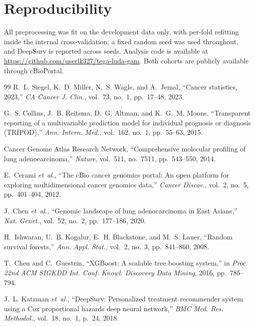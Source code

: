 \documentclass[journal]{IEEEtran}
\begin{document}
\section*{Reproducibility}
All preprocessing was fit on the development data only, with per-fold refitting
inside the internal cross-validation; a fixed random seed was used throughout,
and DeepSurv is reported across seeds. Analysis code is available at
\url{https://github.com/userlk327/tcga-luda-gam}. Both cohorts are publicly
available through cBioPortal.

\begin{thebibliography}{99}
 R.~L. Siegel, K.~D. Miller, N.~S. Wagle, and A.~Jemal,
``Cancer statistics, 2023,'' \emph{CA Cancer J. Clin.}, vol.~73, no.~1,
pp.~17--48, 2023.

 G.~S. Collins, J.~B. Reitsma, D.~G. Altman, and K.~G.~M.
Moons, ``Transparent reporting of a multivariable prediction model for
individual prognosis or diagnosis (TRIPOD),'' \emph{Ann. Intern. Med.},
vol.~162, no.~1, pp.~55--63, 2015.

 Cancer Genome Atlas Research Network, ``Comprehensive
molecular profiling of lung adenocarcinoma,'' \emph{Nature}, vol.~511,
no.~7511, pp.~543--550, 2014.

 E.~Cerami \emph{et~al.}, ``The cBio cancer genomics
portal: An open platform for exploring multidimensional cancer genomics data,''
\emph{Cancer Discov.}, vol.~2, no.~5, pp.~401--404, 2012.

 J.~Chen \emph{et~al.}, ``Genomic landscape of lung
adenocarcinoma in East Asians,'' \emph{Nat. Genet.}, vol.~52, no.~2,
pp.~177--186, 2020.

 H.~Ishwaran, U.~B. Kogalur, E.~H. Blackstone, and M.~S.
Lauer, ``Random survival forests,'' \emph{Ann. Appl. Stat.}, vol.~2, no.~3,
pp.~841--860, 2008.

 T.~Chen and C.~Guestrin, ``XGBoost: A scalable tree boosting
system,'' in \emph{Proc. 22nd ACM SIGKDD Int. Conf. Knowl. Discovery Data
Mining}, 2016, pp.~785--794.

 J.~L. Katzman \emph{et~al.}, ``DeepSurv: Personalized
treatment recommender system using a Cox proportional hazards deep neural
network,'' \emph{BMC Med. Res. Methodol.}, vol.~18, no.~1, p.~24, 2018.


\end{thebibliography}
\end{document}
